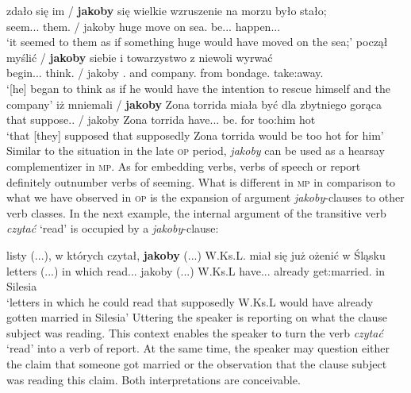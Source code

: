 \documentclass[output=paper
,modfonts
,nonflat]{langsci/langscibook}
\begin{document}
\ea \ea \gll	zdało się im / \textbf{jakoby} się wielkie wzruszenie na morzu było stało; \label{korba_seem} \\
		seem.{\lptcp}.{\sg}.{\n} {} them.{\dat} / jakoby {} huge move on sea.{\LOC} be.{\lptcp}.{\sg}.{\n} happen.{\lptcp}.{\sg}.{\n} \\
	\glt	`it seemed to them as if something huge would have moved on the sea;' 
	\ex\gll	począł myślić / \textbf{jakoby} siebie i towarzystwo z niewoli wyrwać \label{korba_think} \\
		begin.{\lptcp}.{\sg}.{\masc} think.{\infv} / jakoby {}.{\acc} and company.{\acc} from bondage.{\gen} take:away.{\infv} \\
	\glt	`[he] began to think as if he would have the intention to rescue himself and the company' 
	\ex\gll	iż mniemali / \textbf{jakoby} Zona torrida miała być dla zbytniego gorąca \label{korba_suppose} \\
		that suppose.{\lptcp}.{\vir} / jakoby Zona torrida have.{\lptcp}.{\sg}.{\fem} be.{\infv} for {too:him} hot \\
	\glt	`that [they] supposed that supposedly Zona torrida would be too hot for him' 
\z\z
Similar to the situation in the late \textsc{op} period, \emph{jakoby} can be used as a hearsay complementizer in \textsc{mp}. As for embedding verbs, verbs of speech or report definitely outnumber verbs of seeming. What is different in \textsc{mp} in comparison to what we have observed in \textsc{op} is the expansion of argument \emph{jakoby}-clauses to other verb classes. In the next example, the internal argument of the transitive verb \emph{czytać} `read' is occupied by a \emph{jakoby}-clause:

\ea \gll listy (...), w których czytał, \textbf{jakoby} (...) W.Ks.L. miał się już ożenić w Śląsku \label{nic} \\
		letters (...) in which read.{\lptcp}.{\sg}.{\masc} jakoby (...) W.Ks.L have.{\lptcp}.{\sg}.{\masc} {} already {get:married}.{\infv} in Silesia \\
\glt	 `letters in which he could read that supposedly W.Ks.L would have already gotten married in Silesia' 
\z
Uttering  the speaker is reporting on what the clause subject was reading. This context enables the speaker to turn the verb \emph{czytać} `read' into a verb of report. At the same time, the speaker may question either the claim that someone got married or the observation that the clause subject was reading this claim. Both interpretations are conceivable.
\end{document}
